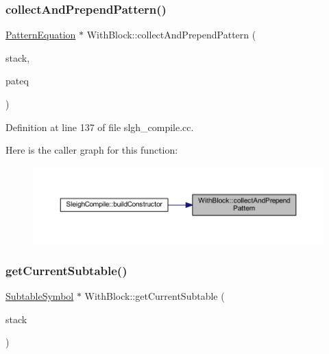 \subsubsection{\texorpdfstring{collectAndPrependPattern()}{collectAndPrependPattern()}}
{\footnotesize\ttfamily \mbox{\hyperlink{class_pattern_equation}{Pattern\+Equation}} $\ast$ With\+Block\+::collect\+And\+Prepend\+Pattern (\begin{DoxyParamCaption}\item[{const list$<$ \mbox{\hyperlink{class_with_block}{With\+Block}} $>$ \&}]{stack,  }\item[{\mbox{\hyperlink{class_pattern_equation}{Pattern\+Equation}} $\ast$}]{pateq }\end{DoxyParamCaption})\hspace{0.3cm}{\ttfamily [static]}}



Definition at line 137 of file slgh\+\_\+compile.\+cc.

Here is the caller graph for this function\+:
\nopagebreak
\begin{figure}[H]
\begin{center}
\leavevmode
\includegraphics[width=350pt]{class_with_block_a700a2814e4ba5491e74fe73822ed8901_icgraph}
\end{center}
\end{figure}
\mbox{\label{class_with_block_a1b7aa928d0295023c7e8835f4a39ef02}} 
\subsubsection{\texorpdfstring{getCurrentSubtable()}{getCurrentSubtable()}}
{\footnotesize\ttfamily \mbox{\hyperlink{class_subtable_symbol}{Subtable\+Symbol}} $\ast$ With\+Block\+::get\+Current\+Subtable (\begin{DoxyParamCaption}\item[{const list$<$ \mbox{\hyperlink{class_with_block}{With\+Block}} $>$ \&}]{stack }\end{DoxyParamCaption})\hspace{0.3cm}{\ttfamily [static]}}



